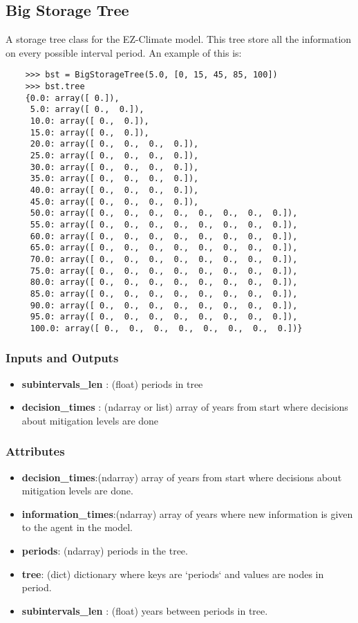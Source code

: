 \documentclass[12pt]{article}
\begin{document}
\subsection{Big Storage Tree}
A storage tree class for the EZ-Climate model. This tree store all the information on every possible interval period. An example of this is:
\begin{verbatim}
    >>> bst = BigStorageTree(5.0, [0, 15, 45, 85, 100])
    >>> bst.tree
    {0.0: array([ 0.]),
     5.0: array([ 0.,  0.]),
     10.0: array([ 0.,  0.]),
     15.0: array([ 0.,  0.]),
     20.0: array([ 0.,  0.,  0.,  0.]),
     25.0: array([ 0.,  0.,  0.,  0.]),
     30.0: array([ 0.,  0.,  0.,  0.]),
     35.0: array([ 0.,  0.,  0.,  0.]),
     40.0: array([ 0.,  0.,  0.,  0.]),
     45.0: array([ 0.,  0.,  0.,  0.]),
     50.0: array([ 0.,  0.,  0.,  0.,  0.,  0.,  0.,  0.]),
     55.0: array([ 0.,  0.,  0.,  0.,  0.,  0.,  0.,  0.]),
     60.0: array([ 0.,  0.,  0.,  0.,  0.,  0.,  0.,  0.]),
     65.0: array([ 0.,  0.,  0.,  0.,  0.,  0.,  0.,  0.]),
     70.0: array([ 0.,  0.,  0.,  0.,  0.,  0.,  0.,  0.]),
     75.0: array([ 0.,  0.,  0.,  0.,  0.,  0.,  0.,  0.]),
     80.0: array([ 0.,  0.,  0.,  0.,  0.,  0.,  0.,  0.]),
     85.0: array([ 0.,  0.,  0.,  0.,  0.,  0.,  0.,  0.]),
     90.0: array([ 0.,  0.,  0.,  0.,  0.,  0.,  0.,  0.]),
     95.0: array([ 0.,  0.,  0.,  0.,  0.,  0.,  0.,  0.]),
     100.0: array([ 0.,  0.,  0.,  0.,  0.,  0.,  0.,  0.])}
\end{verbatim}
\subsubsection{Inputs and Outputs}
\begin{itemize}
  \item \textbf{subintervals\_len} : (float) periods in tree
  \item \textbf{decision\_times} : (ndarray or list)
		array of years from start where decisions about mitigation levels are done
\end{itemize}
\subsubsection{Attributes}
\begin{itemize}
\item \textbf{decision\_times}:(ndarray) array of years from start where decisions about mitigation levels are done.
\item \textbf{information\_times}:(ndarray) array of years where new information is given to the agent in the model.
\item \textbf{periods}: (ndarray) 	periods in the tree.
\item \textbf{tree}: (dict) dictionary where keys are `periods` and values are nodes in period.
\item \textbf{subintervals\_len} : (float) years between periods in tree.
\end{itemize}
\end{document}
